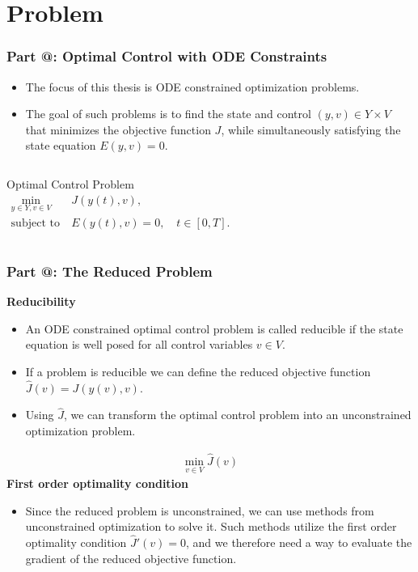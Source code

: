 \documentclass[9pt]{beamer}
\makeatletter
\newcommand*{\rom}[1]{\expandafter\@slowromancap\romannumeral #1@}
\makeatother
\begin{document}
\section{Problem}
\begin{frame}
\frametitle{\textbf{ Part \rom{2}:} Optimal Control with ODE Constraints}
\begin{itemize}
\item{The focus of this thesis is ODE constrained optimization problems.}
\item{The goal of such problems is to find the state and control $(y,v)\in Y\times V$ that minimizes the objective function $J$, while simultaneously satisfying the state equation $E(y,v)=0$.}
\end{itemize}
\begin{columns}
\begin{block}{Optimal Control Problem}
\begin{align*}
\min_{y\in Y,v\in V} &J(y(t),v), \\
\textrm{subject to} \ &E(y(t),v)=0,\quad t\in[0,T].
\end{align*}
\end{block}
\end{columns}
\end{frame}
\begin{frame}
\frametitle{\textbf{ Part \rom{2}:} The Reduced Problem}
\textbf{Reducibility}
\begin{itemize}
\item{An ODE constrained optimal control problem is called reducible if the state equation is well posed for all control variables $v\in V$.}
\item{If a problem is reducible we can define the reduced objective function $\hat{J}(v) = J(y(v),v)$.}
\item{Using $\hat J$, we can transform the optimal control problem into an unconstrained optimization problem.}
\end{itemize}
\begin{align*}
\min_{v\in V}\hat J (v)
\end{align*}
\textbf{First order optimality condition}
\begin{itemize}
\item{Since the reduced problem is unconstrained, we can use methods from unconstrained optimization to solve it. Such methods utilize the first order optimality condition $\hat J'(v)=0$, and we therefore need a way to evaluate the gradient of the reduced objective function.}
\end{itemize}
\end{frame}
\end{document}

